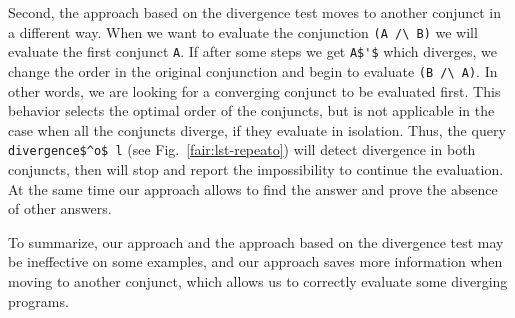 Second, the approach based on the divergence test moves to another conjunct in a different way. When we want to evaluate the conjunction \lstinline{(A /\ B)} we will evaluate the first conjunct \lstinline{A}. If after some steps we get \lstinline{A$'$} which diverges, we change the order in the original conjunction and begin to evaluate \lstinline{(B /\ A)}. In other words, we are looking for a converging conjunct to be evaluated first. This behavior selects the optimal order of the conjuncts, but is not applicable in the case when all the conjuncts diverge, if they evaluate in isolation. Thus, the query \lstinline{divergence$^o$ l} (see Fig.~\ref{fair:lst-repeato}) will detect divergence in both conjuncts, then will stop and report the impossibility to continue the evaluation. At the same time our approach allows to find the answer and prove the absence of other answers.

To summarize, our approach and the approach based on the divergence test may be ineffective on some examples, and our approach saves more information when moving to another conjunct, which allows us to correctly evaluate some diverging programs.

\begin{figure}
\centering
\begin{minipage}{.5\textwidth}
  \centering
{}
  \label{fair:plot-reverso}
\end{minipage}%
\begin{minipage}{.5\textwidth}
  \centering
{}
\label{fair:plot-sorto}
\end{minipage}
\end{figure}

